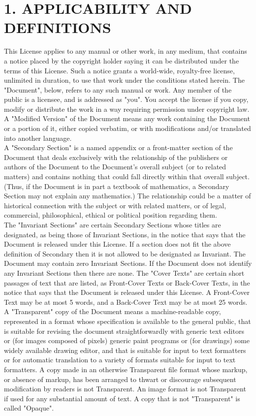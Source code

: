 \section{1. APPLICABILITY AND DEFINITIONS}


This License applies to any manual or other work, in any medium, that contains a notice placed by the copyright holder saying it can be distributed under the terms of this License. Such a notice grants a world-wide, royalty-free license, unlimited in duration, to use that work under the conditions stated herein. The "Document", below, refers to any such manual or work. Any member of the public is a licensee, and is addressed as "you". You accept the license if you copy, modify or distribute the work in a way requiring permission under copyright law.
A "Modified Version" of the Document means any work containing the Document or a portion of it, either copied verbatim, or with modifications and/or translated into another language.\\
A "Secondary Section" is a named appendix or a front-matter section of the Document that deals exclusively with the relationship of the publishers or authors of the Document to the Document's overall subject (or to related matters) and contains nothing that could fall directly within that overall subject. (Thus, if the Document is in part a textbook of mathematics, a Secondary Section may not explain any mathematics.) The relationship could be a matter of historical connection with the subject or with related matters, or of legal, commercial, philosophical, ethical or political position regarding them.\\
The "Invariant Sections" are certain Secondary Sections whose titles are designated, as being those of Invariant Sections, in the notice that says that the Document is released under this License. If a section does not fit the above definition of Secondary then it is not allowed to be designated as Invariant. The Document may contain zero Invariant Sections. If the Document does not identify any Invariant Sections then there are none.
The "Cover Texts" are certain short passages of text that are listed, as Front-Cover Texts or Back-Cover Texts, in the notice that says that the Document is released under this License. A Front-Cover Text may be at most 5 words, and a Back-Cover Text may be at most 25 words.\\
A "Transparent" copy of the Document means a machine-readable copy, represented in a format whose specification is available to the general public, that is suitable for revising the document straightforwardly with generic text editors or (for images composed of pixels) generic paint programs or (for drawings) some widely available drawing editor, and that is suitable for input to text formatters or for automatic translation to a variety of formats suitable for input to text formatters. A copy made in an otherwise Transparent file format whose markup, or absence of markup, has been arranged to thwart or discourage subsequent modification by readers is not Transparent. An image format is not Transparent if used for any substantial amount of text. A copy that is not "Transparent" is called "Opaque".\\

